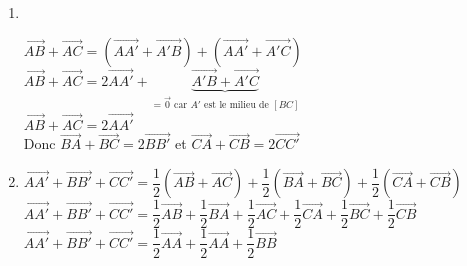 \begin{enumerate}

\item ~ 



 $\overrightarrow{AB} + \overrightarrow{AC} = \left(\overrightarrow{AA'} + \overrightarrow{A'B}\right) + \left(\overrightarrow{AA'} + \overrightarrow{A'C}\right) $\\

$ \overrightarrow{AB} + \overrightarrow{AC} = 2\overrightarrow{AA'} + \underbrace{\overrightarrow{A'B} + \overrightarrow{A'C}}_{= \overrightarrow{0} \textrm { car } A' \textrm { est le milieu de } \left[BC\right]}$\\

$\overrightarrow{AB} + \overrightarrow{AC} = 2\overrightarrow{AA'} $\\

Donc $\overrightarrow{BA} + \overrightarrow{BC} = 2\overrightarrow{BB'} $ et $ \overrightarrow{CA} + \overrightarrow{CB} = 2\overrightarrow{CC'} $\\

\item  $\overrightarrow{AA'} + \overrightarrow{BB'} + \overrightarrow{CC'} = \dfrac{1}{2} \left(\overrightarrow{AB} + \overrightarrow{AC} \right) + \dfrac{1}{2} \left(\overrightarrow{BA} + \overrightarrow{BC} \right) + \dfrac{1}{2} \left( \overrightarrow{CA} + \overrightarrow{CB} \right) $\\

$\overrightarrow{AA'} + \overrightarrow{BB'} + \overrightarrow{CC'} = \dfrac{1}{2} \overrightarrow{AB} + \dfrac{1}{2} \overrightarrow{BA} + \dfrac{1}{2} \overrightarrow{AC} + \dfrac{1}{2} \overrightarrow{CA} + \dfrac{1}{2} \overrightarrow{BC} + \dfrac{1}{2} \overrightarrow{CB} $\\

$ \overrightarrow{AA'} + \overrightarrow{BB'} + \overrightarrow{CC'} = \dfrac{1}{2} \overrightarrow{AA} + \dfrac{1}{2} \overrightarrow{AA} + \dfrac{1}{2} \overrightarrow{BB} $


\end{enumerate}
